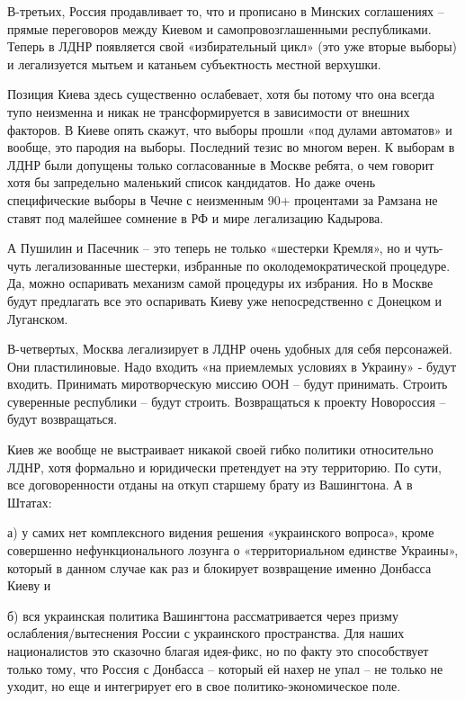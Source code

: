 В-третьих, Россия продавливает то, что и прописано в Минских соглашениях –
прямые переговоров между Киевом и самопровозглашенными республиками. Теперь в
ЛДНР появляется свой «избирательный цикл» (это уже вторые выборы) и
легализуется мытьем и катаньем субъектность местной верхушки.

Позиция Киева здесь существенно ослабевает, хотя бы потому что она всегда тупо
неизменна и никак не трансформируется в зависимости от внешних факторов. В
Киеве опять скажут, что выборы прошли «под дулами автоматов» и вообще, это
пародия на выборы. Последний тезис во многом верен. К выборам в ЛДНР были
допущены только согласованные в Москве ребята, о чем говорит хотя бы
запредельно маленький список кандидатов. Но даже очень специфические выборы в
Чечне с неизменным 90+ процентами за Рамзана не ставят под малейшее сомнение в
РФ и мире легализацию Кадырова.


А Пушилин и Пасечник – это теперь не только «шестерки Кремля», но и чуть-чуть
легализованные шестерки, избранные по околодемократической процедуре. Да, можно
оспаривать механизм самой процедуры их избрания. Но в Москве будут предлагать
все это оспаривать Киеву уже непосредственно с Донецком и Луганском.

В-четвертых, Москва легализирует в ЛДНР очень удобных для себя персонажей. Они
пластилиновые. Надо входить «на приемлемых условиях в Украину» - будут входить.
Принимать миротворческую миссию ООН – будут принимать. Строить суверенные
республики – будут строить. Возвращаться к проекту Новороссия – будут
возвращаться.

Киев же вообще не выстраивает никакой своей гибко политики относительно ЛДНР,
хотя формально и юридически претендует на эту территорию. По сути, все
договоренности отданы на откуп старшему брату из Вашингтона. А в Штатах:

а) у самих нет комплексного видения решения «украинского вопроса», кроме
совершенно нефункционального лозунга о «территориальном единстве Украины»,
который в данном случае как раз и блокирует возвращение именно Донбасса Киеву и 

б) вся украинская политика Вашингтона рассматривается через призму
ослабления/вытеснения России с украинского пространства. Для наших
националистов это сказочно благая идея-фикс, но по факту это способствует
только тому, что Россия с Донбасса – который ей нахер не упал – не только не
уходит, но еще и интегрирует его в свое политико-экономическое поле.

